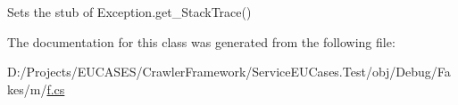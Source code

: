 Sets the stub of Exception.\-get\-\_\-\-Stack\-Trace()



The documentation for this class was generated from the following file\-:\begin{DoxyCompactItemize}
\item 
D\-:/\-Projects/\-E\-U\-C\-A\-S\-E\-S/\-Crawler\-Framework/\-Service\-E\-U\-Cases.\-Test/obj/\-Debug/\-Fakes/m/\hyperlink{m_2f_8cs}{f.\-cs}\end{DoxyCompactItemize}
